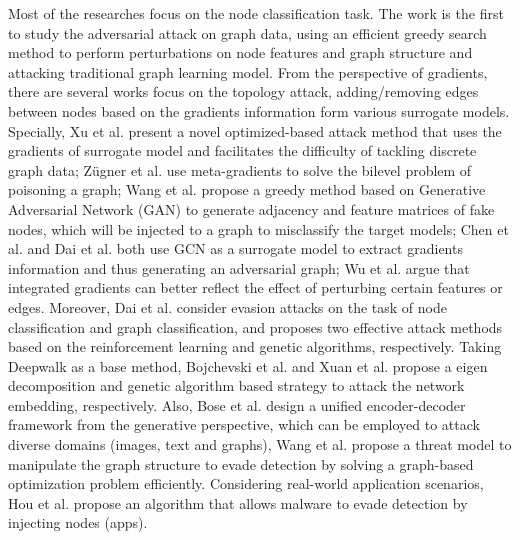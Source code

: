Most of the researches focus on the node classification task. The work \cite{zugner2018adversarial} is the first to study the adversarial attack on graph data, using an efficient greedy search method to perform perturbations on node features and graph structure and attacking traditional graph learning model. From the perspective of gradients, there are several works \cite{xu2019topology,zugner2019adversarial,wang2018attack,chen2018fast,dai2018adversarial,wu2019adversarial} focus on the topology attack, adding/removing edges between nodes based on the gradients information form various surrogate models. Specially, Xu et al. \cite{xu2019topology} present a novel optimized-based attack method that uses the gradients of surrogate model and facilitates the difficulty of tackling discrete graph data; Z\"ugner et al. \cite{zugner2019adversarial} use meta-gradients to solve the bilevel problem of poisoning a graph; Wang et al. \cite{wang2018attack} propose a greedy method based on Generative Adversarial Network (GAN) \cite{goodfellow2014generative} to generate adjacency and feature matrices of fake nodes, which will be injected to a graph to misclassify the target models; Chen et al. and Dai et al. \cite{chen2018fast, dai2018adversarial} both use GCN as a surrogate model to extract gradients information and thus generating an adversarial graph; Wu et al. \cite{wu2019adversarial} argue that integrated gradients can better reflect the effect of perturbing certain features or edges. Moreover, Dai et al. \cite{dai2018adversarial} consider evasion attacks on the task of node classification and graph classification, and proposes two effective attack methods based on the reinforcement learning and genetic algorithms, respectively. Taking Deepwalk \cite{perozzi2014deepwalk} as a base method,  Bojchevski et al. \cite{bojchevski2019adversarial} and Xuan et al. \cite{xuan2019unsupervised} propose a eigen decomposition and genetic algorithm based strategy to attack the network embedding, respectively. Also, Bose et al. \cite{bose2019generalizable} design a unified encoder-decoder framework from the generative perspective, which can be employed to attack diverse domains (images, text and graphs), Wang et al. \cite{wang2019attacking} propose a threat model to manipulate the graph structure to evade detection by solving a graph-based optimization problem efficiently. Considering real-world application scenarios, Hou et al. \cite{hou2019alphacyber} propose an algorithm that allows malware to evade detection by injecting nodes (apps).

